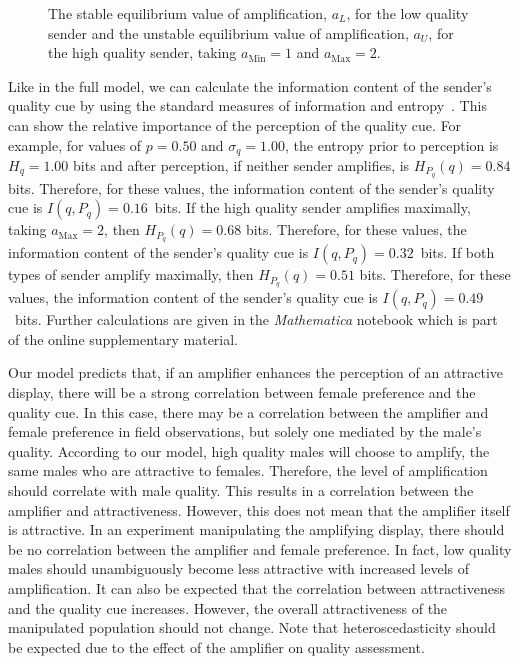 \documentclass[a4paper,12pt]{article}
\numberwithin{equation}{section}
\numberwithin{figure}{section}
\begin{document}
\begin{figure}[h]
\captionsetup{width=380pt}
\begin{center}
\hspace{10mm}
\caption[]{The stable equilibrium value of amplification, $a_{L}$, for the low quality sender and the unstable equilibrium value of amplification, $a_{U}$, for the high quality sender, taking $a_{\text{Min}}=1$ and $a_{\text{Max}}=2$.\\}
\label{fig:Figure 56}
\end{center}
\end{figure}

\enlargethispage{3mm}

Like in the full model, we can calculate the information content of the sender's quality cue by using the standard measures of information and entropy~\cite{Applebaum1996}. This can show the relative importance of the perception of the quality cue. For example, for values of $p = 0.50$ and $\sigma_{q} = 1.00$, the entropy prior to perception is $H_{q} = 1.00$ bits and after perception, if neither sender amplifies, is $H_{P_{q}}(q) = 0.84$ bits. Therefore, for these values, the information content of the sender's quality cue is $I(q, P_{q}) = 0.16$~bits. If the high quality sender amplifies maximally, taking $a_{\text{Max}}=2$, then $H_{P_{q}}(q) = 0.68$ bits. Therefore, for these values, the information content of the sender's quality cue is $I(q, P_{q}) = 0.32$~bits. If both types of sender amplify maximally, then $H_{P_{q}}(q) = 0.51$ bits. Therefore, for these values, the information content of the sender's quality cue is $I(q, P_{q}) = 0.49$~bits. Further calculations are given in the \textit{Mathematica} notebook which is part of the online supplementary material.

Our model predicts that, if an amplifier enhances the perception of an attractive display, there will be a strong correlation between female preference and the quality cue. In this case, there may be a correlation between the amplifier and female preference in field observations, but solely one mediated by the male's quality. According to our model, high quality males will choose to amplify, the same males who are attractive to females. Therefore, the level of amplification should correlate with male quality. This results in a correlation between the amplifier and attractiveness. However, this does not mean that the amplifier itself is attractive. In an experiment manipulating the amplifying display, there should be no correlation between the amplifier and female preference. In fact, low quality males should unambiguously become less attractive with increased levels of amplification. It can also be expected that the correlation between attractiveness and the quality cue increases. However, the overall attractiveness of the manipulated population should not change. Note that heteroscedasticity should be expected due to the effect of the amplifier on quality assessment.
\end{document}
